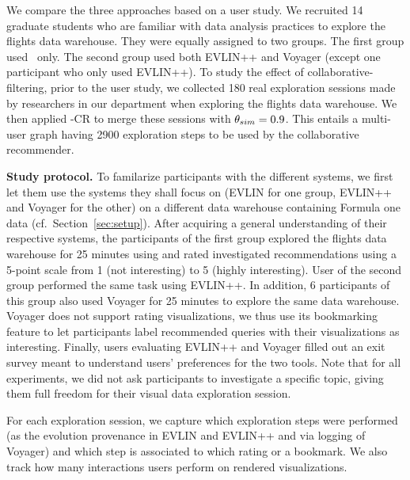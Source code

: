 We compare the three approaches based on a user study. We recruited 14 graduate students who are familiar with data analysis practices to explore the flights data warehouse. They were equally assigned to two groups. The first group used \prototype\ only. The second group used both EVLIN++ and Voyager (except one participant who only used EVLIN++). To study the effect of collaborative-filtering, prior to the user study, we collected 180 real exploration sessions made by researchers in our department when exploring the flights data warehouse. We then applied \mlm{}-CR to merge these sessions with $\theta_{sim} = 0.9$. This entails a multi-user graph having 2900 exploration steps to be used by the collaborative recommender. 


\noindent \textbf{Study protocol.} To familarize participants with the different systems, we first let them use the systems they shall focus on (EVLIN for one group, EVLIN++ and Voyager for the other) on a different data warehouse containing Formula one data (cf.~Section~\ref{sec:setup}). After acquiring a general understanding of their respective systems, the participants of the first group explored the flights data warehouse for 25 minutes using \prototype{} and rated investigated recommendations using a 5-point scale from 1 (not interesting) to 5 (highly interesting). User of the second group performed the same task using EVLIN++. In addition, 6 participants of this group also used Voyager for 25 minutes to explore the same data warehouse. Voyager does not support rating visualizations, we thus use its bookmarking feature to let participants label recommended queries with their visualizations as interesting. 
%
Finally, users evaluating EVLIN++ and Voyager filled out an exit survey meant to understand users' preferences for the two tools. 
Note that for all experiments, we did not ask participants to investigate a specific topic, giving them full freedom for their visual data exploration session.

For each exploration session, we capture which exploration steps were performed (as the evolution provenance in EVLIN and EVLIN++ and via logging of Voyager) and which step is associated to which rating or a bookmark. We also track how many interactions users perform on rendered visualizations.



